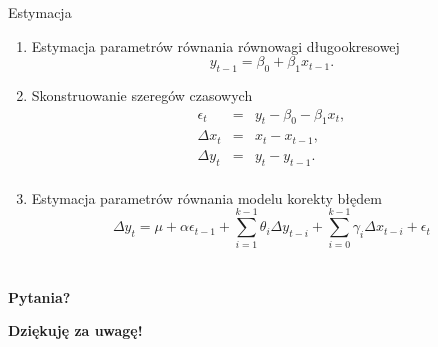 \documentclass[a4paper, 11pt]{beamer}
\begin{document}
	\begin{frame}{Estymacja}
		\begin{enumerate}
			\item Estymacja parametrów równania równowagi długookresowej \[
				y_{t-1} = \beta_{0} + \beta_{1} x_{t-1}.
			\]
			\item Skonstruowanie szeregów czasowych \begin{eqnarray*}
				\epsilon_{t} & = & y_{t} - \beta_{0} - \beta_{1} x_{t},\\
				\Delta x_{t} & = & x_{t} - x_{t-1},\\
				\Delta y_{t} & = & y_{t} - y_{t-1}.\\
			\end{eqnarray*}
			\item Estymacja parametrów równania modelu korekty błędem \[
				\Delta y_{t} =
					\mu +
					\alpha \epsilon_{t-1} + 
					\sum_{i=1}^{k-1} \theta_{i} \Delta y_{t-i} + 
					\sum_{i=0}^{k-1} \gamma_{i} \Delta x_{t-i} + 
					\epsilon_{t}
			\]
		\end{enumerate}
	\end{frame}

	\section*{}

	\begin{frame}
		\center
		\Huge \bfseries
		Pytania?
	\end{frame}

	\begin{frame}
		\center
		\Huge \bfseries
		Dziękuję za uwagę!
	\end{frame}
\end{document}
